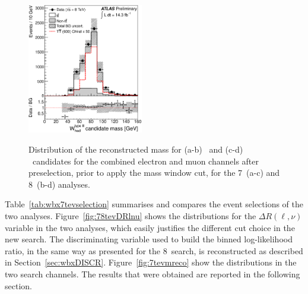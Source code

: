 \begin{figure}[h!tb]
\begin{center}
{                \includegraphics[width=0.45\textwidth]{wbx_analysis_14ifb/figures/confnoteplots/VLQAna_WbX_WpreselType2_M_ELEMUON_preselW_NOMINAL.eps}}
	\caption[bla]{Distribution of the reconstructed mass for 
        (a-b) \wi\ and (c-d) \wii\ candidates
        for the combined electron and muon channels after preselection,
        prior to apply the mass window cut, for the 7\tev\ (a-c) and 8\tev\ (b-d) analyses.
        \label{fig:7tevmwhad}}
\end{center}\end{figure}

Table~\ref{tab:wbx7tevselection} summarises and compares the event selections
of the two analyses. Figure~\ref{fig:78tevDRlnu} shows the
distributions for the $\Delta R(\ell,\nu)$ variable in the
two analyses, which easily justifies the different cut choice
in the new search. The discriminating variable used 
to build the binned log-likelihood ratio, in the same 
way as presented for the 8\tev\ search, is reconstructed
as described in Section~\ref{sec:wbxDISCR}. Figure~\ref{fig:7tevmreco}
show the distributions in the two search channels.
The results that were obtained are reported in the following section.

